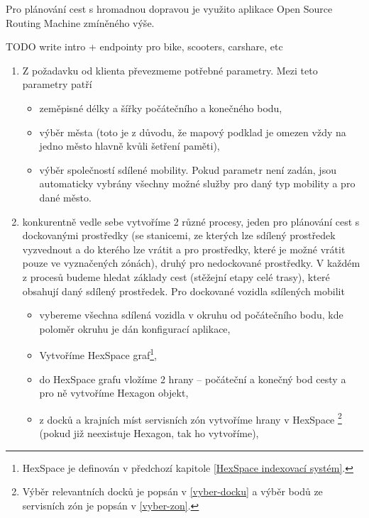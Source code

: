 \documentclass[thesis=M,czech]{FITthesis}[2019/12/23]
\theoremstyle{plain}
\theoremstyle{definition}
\begin{document}
Pro plánování cest s hromadnou dopravou je využito aplikace Open Source Routing Machine zmíněného výše.

TODO write intro + endpointy pro bike, scooters, carshare, etc



\begin{enumerate}
	\item Z požadavku od klienta převezmeme potřebné parametry. Mezi teto parametry patří
	\begin{itemize}
		\item zeměpisné délky a šířky počátečního a konečného bodu,
		\item výběr města (toto je z důvodu, že mapový podklad je omezen vždy na jedno město hlavně kvůli šetření paměti),
		\item výběr společností sdílené mobility. Pokud parametr není zadán, jsou automaticky vybrány všechny možné služby pro daný typ mobility a pro dané město.
	\end{itemize}
	\item konkurentně vedle sebe vytvoříme 2 různé procesy, jeden pro plánování cest s dockovanými prostředky (se stanicemi, ze kterých lze sdílený prostředek vyzvednout a do kterého lze vrátit a pro prostředky, které je možné vrátit pouze ve vyznačených zónách), druhý pro nedockované prostředky. V každém z procesů budeme hledat základy cest (stěžejní etapy celé trasy), které obsahují daný sdílený prostředek. Pro dockované vozidla sdílených mobilit
	\begin{itemize}
		\item vybereme všechna sdílená vozidla v okruhu od počátečního bodu, kde poloměr okruhu je dán konfigurací aplikace,
		\item Vytvoříme HexSpace graf\footnote{HexSpace je definován v předchozí kapitole \ref{HexSpace indexovací systém}.},
		\item do HexSpace grafu vložíme 2 hrany -- počáteční a konečný bod cesty a pro ně vytvoříme Hexagon objekt,
		\item z docků a krajních míst servisních zón vytvoříme hrany v HexSpace \footnote{ Výběr relevantních docků je popsán v \ref{vyber-docku}  a výběr bodů ze servisních zón je popsán v \ref{vyber-zon}.} (pokud již neexistuje Hexagon, tak ho vytvoříme), 

\end{itemize}
\end{enumerate}
\end{document}
